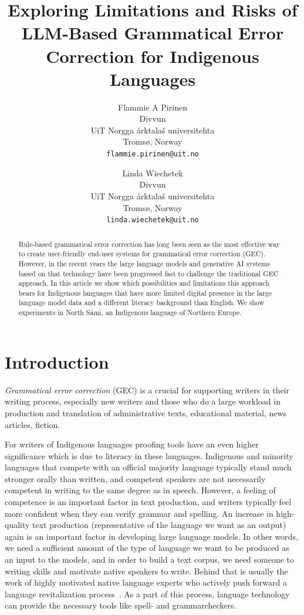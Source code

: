 \documentclass[free]{flammie}
\title{Exploring Limitations and Risks of LLM-Based Grammatical Error Correction
for Indigenous Languages}
\author{Flammie A Pirinen \\
  Divvun \\
  UiT Norgga árktalaš universitehta \\
  Tromsø, Norway \\
  \texttt{flammie.pirinen@uit.no} \\\and%
  Linda Wiechetek \\
  Divvun \\
  UiT Norgga árktalaš universitehta \\
  Tromsø, Norway \\
  \texttt{linda.wiechetek@uit.no} \\}
\begin{document}
\maketitle
\begin{abstract}
    Rule-based grammatical error correction has long been seen as the most
    effective way to create user-friendly end-user systems for grammatical error
    correction (GEC). However, in the recent years the large language models and
    generative AI systems based on that technology have been progressed fast to
    challenge the traditional GEC approach. In this article we show which
    possibilities and limitations this approach bears for Indigenous languages
    that have more limited digital presence in the large language model data and
    a different literacy background than English. We show experiments in North
    Sámi, an Indigenous language of Northern Europe.
\end{abstract}

\section{Introduction}

\textit{Grammatical error correction} (GEC) is a crucial for supporting writers
in their writing process, especially new writers and those who do a large
workload in production and translation of administrative texts, educational
material, news articles, fiction.

For writers of Indigenous languages proofing tools have an even higher
significance which is due to literacy in these languages. Indigenous and
minority languages that compete with an official majority language typically
stand much stronger orally than written, and competent speakers are not
necessarily competent in writing to the same degree as in speech. However, a
feeling of competence is an important factor in text production, and writers
typically feel more confident when they can verify grammar and spelling.  An
increase in high-quality text production (representative of the language we want
as an output) again is an important factor in developing large language models.
In other words, we need a sufficient amount of the type of language we want to
be produced as an input to the models, and in order to build a text corpus, we
need someone to writing skills and motivate native speakers to write.  Behind
that is usually the work of highly motivated native language experts who
actively push forward a language revitalization
process~\cite{olthuis2013revitalising}.  As a part of this process, language
technology can provide the necessary tools like spell- and grammarcheckers.
\end{document}
